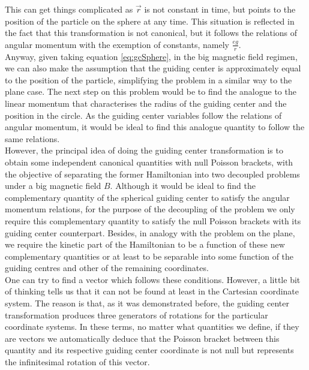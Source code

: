 This can get things complicated as $\vec{r}$ is not constant in time, but points to the position of the particle on the sphere at any time. This situation is reflected in the fact that this transformation is not canonical, but it follows the relations of angular momentum with the exemption of constants, namely $\frac{eg}{r}$.\\

Anyway, given taking equation \eqref{eq:gcSphere}, in the big magnetic field regimen, we can also make the assumption that the guiding center is approximately equal to the position of the particle, simplifying the problem in a similar way to the plane case. The next step on this problem would be to find the analogue to the linear momentum that characterises the radius of the guiding center and the position in the circle. As the guiding center variables follow the relations of angular momentum, it would be ideal to find this analogue quantity to follow the same relations.\\

However, the principal idea of doing the guiding center transformation is to obtain some independent canonical quantities with null Poisson brackets, with the objective of separating the former Hamiltonian into two decoupled problems under a big magnetic field $B$. Although it would be ideal to find the complementary quantity of the spherical guiding center to satisfy the angular momentum relations, for the purpose of the decoupling of the problem we only require this complementary quantity to satisfy the null Poisson brackets with its guiding center counterpart. Besides, in analogy with the problem on the plane, we require the kinetic part of the Hamiltonian to be a function of these new complementary quantities or at least to be separable into some function of the guiding centres and other of the remaining coordinates.\\

One can try to find a vector which follows these conditions. However, a little bit of thinking tells us that it can not be found at least in the Cartesian coordinate system. The reason is that, as it was demonstrated before, the guiding center transformation produces three generators of rotations for the particular coordinate systems. In these terms, no matter what quantities we define, if they are vectors we automatically deduce that the Poisson bracket between this quantity and its respective guiding center coordinate is not null but represents the infinitesimal rotation of this vector.\\

